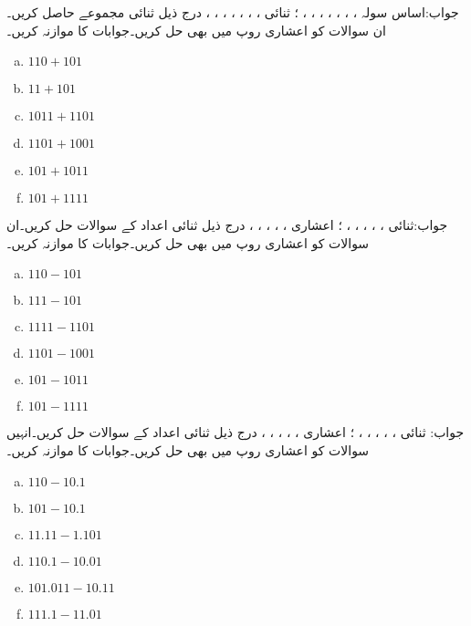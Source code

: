 جواب:اساس سولہ   ، ، ، ، ، ، ، ؛ ثنائی  ، ، ، ، ، ، ، 
درج ذیل ثنائی مجموعے حاصل کریں۔ان سوالات کو اعشاری روپ میں بھی حل کریں۔جوابات کا موازنہ کریں۔
\begin{multicols}{4}
\begin{enumerate}[a.]

\item  
 \(110+101\)  
\item 
 \(11+101\) 

\item  
 \(1011+1101\)  
\item 
 \(1101+1001\)   

\item  
 \(101+1011\)  
\item 
 \(101+1111\)  
\end{enumerate}
\end{multicols}
جواب:ثنائی ، ، ، ، ، ؛ 
اعشاری   ، ، ، ، ، 
درج ذیل ثنائی اعداد کے سوالات حل کریں۔ان سوالات کو اعشاری روپ میں بھی حل کریں۔جوابات کا موازنہ کریں۔
\begin{multicols}{4}
\begin{enumerate}[a.]

\item  
 \(110-101\)  
\item 
 \(111-101\) 

\item  
 \(1111-1101\)  
\item 
 \(1101-1001\)   

\item  
 \(101-1011\)  
\item 
 \(101-1111\)
\end{enumerate}
\end{multicols}
جواب: ثنائی  ، ، ،  ، ، ؛
 اعشاری  ، ، ، ،  ، 
درج ذیل ثنائی اعداد کے سوالات حل کریں۔انہیں سوالات کو اعشاری روپ میں بھی حل کریں۔جوابات کا موازنہ کریں۔
\begin{multicols}{4}
\begin{enumerate}[a.]
\item  
 \(110-10.1\)  
\item 
 \(101-10.1\) 

\item  
 \(11.11-1.101\)  
\item 
 \(110.1-10.01\)   

\item  
 \(101.011-10.11\) 
\item 
 \(111.1-11.01\)
\end{enumerate}
\end{multicols}
